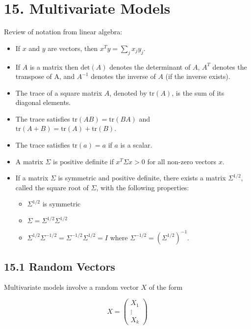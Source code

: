 \section{15. Multivariate Models}\label{multivariate-models}

Review of notation from linear algebra:

\begin{itemize}[tightlist]
\item
  If \(x\) and \(y\) are vectors, then \(x^T y = \sum_j x_j y_j\).
\item
  If \(A\) is a matrix then \(\text{det}(A)\) denotes the determinant of
  \(A\), \(A^T\) denotes the transpose of A, and \(A^{-1}\) denotes the
  inverse of \(A\) (if the inverse exists).
\item
  The trace of a square matrix \(A\), denoted by \(\text{tr}(A)\), is
  the sum of its diagonal elements.
\item
  The trace satisfies \(\text{tr}(AB) = \text{tr}(BA)\) and
  \(\text{tr}(A + B) = \text{tr}(A) + \text{tr}(B)\).
\item
  The trace satisfies \(\text{tr}(a) = a\) if \(a\) is a scalar.
\item
  A matrix \(\Sigma\) is positive definite if \(x^T \Sigma x > 0\) for
  all non-zero vectors \(x\).
\item
  If a matrix \(\Sigma\) is symmetric and positive definite, there
  exists a matrix \(\Sigma^{1/2}\), called the square root of
  \(\Sigma\), with the following properties:

  \begin{itemize}[tightlist]
  \item
\(\Sigma^{1/2}\) is symmetric
  \item
\(\Sigma = \Sigma^{1/2} \Sigma^{1/2}\)
  \item
\(\Sigma^{1/2} \Sigma^{-1/2} = \Sigma^{-1/2} \Sigma^{1/2} = I\)
    where \(\Sigma^{-1/2} = (\Sigma^{1/2})^{-1}\).
  \end{itemize}
\end{itemize}

\subsection{15.1 Random Vectors}\label{random-vectors}

    Multivariate models involve a random vector \(X\) of the form

\[X = \begin{pmatrix} X_1 \\ \vdots \\ X_k \end{pmatrix}\]

